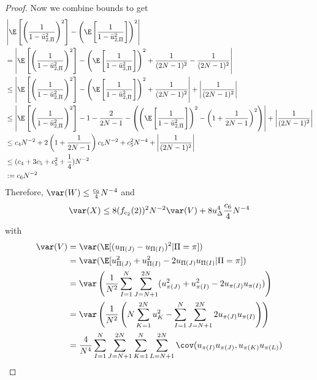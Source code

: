 \begin{proof}
  Now we combine bounds to get
  \begin{align*}
    &\left | \E \left [ \left (\frac{1}{1-\bar{u}_{2,\Pi}^2} \right )^2 \right ] -
      \left ( \E \left [ \frac{1}{1-\bar{u}_{2,\Pi}^2} \right ] \right )^2 \right | \\
    &= \left | \E \left [ \left (\frac{1}{1-\bar{u}_{2,\Pi}^2} \right )^2 \right ] -
      \left ( \E \left [ \frac{1}{1-\bar{u}_{2,\Pi}^2} \right ] \right )^2
    + \frac{1}{(2N-1)^2} - \frac{1}{(2N-1)^2} \right | \\
  &\leq \left | \E \left [ \left (\frac{1}{1-\bar{u}_{2,\Pi}^2} \right )^2 \right ] -
      \left ( \E \left [ \frac{1}{1-\bar{u}_{2,\Pi}^2} \right ] \right )^2
      + \frac{1}{(2N-1)^2} \right | + \left | \frac{1}{(2N-1)^2} \right |\\
    &\leq \left |
      \E \left [ \left (\frac{1}{1-\bar{u}_{2,\Pi}^2} \right )^2 \right ]
      - 1 - \frac{2}{2N-1} -
      \left (
        \left ( \E \left [ \frac{1}{1-\bar{u}_{2,\Pi}^2} \right ] \right )^2
        - \left ( 1 + \frac{1}{2N-1} \right )^2
      \right ) \right | + \left | \frac{1}{(2N-1)^2} \right | \\
    &\leq c_4 N^{-2}
    + 2 \left ( 1 + \frac{1}{2N-1} \right ) c_5 N^{-2} + c_5^2 N^{-4}
    + \left | \frac{1}{(2N-1)^2} \right | \\
    &\leq (c_4 + 3c_5 + c_5^2 + \frac{1}{4}) N^{-2} \\
    &:= c_6 N^{-2}
  \end{align*}
  Therefore, $\var(W) \leq \frac{c_6}{4}N^{-4}$ and
  \begin{equation*}
    \var(X) \leq 8(f_{c_2}(2))^2 N^{-2} \var(V) + 8u_{\Delta}^4 \frac{c_6}{4} N^{-4}
  \end{equation*}
  with
  \begin{align*}
    \var(V) &= \var (\E[(u_{\Pi(J)}-u_{\Pi(I)})^2 | \Pi = \pi]) \\
    &= \var(\E[u_{\Pi(J)}^2+u_{\Pi(I)}^2-2u_{\Pi(J)}u_{\Pi(I)}| \Pi = \pi]) \\
    &= \var \left ( \frac{1}{N^2} \sum_{I=1}^{N}\sum_{J=N+1}^{2N}
    (u_{\pi(J)}^2+u_{\pi(I)}^2-2u_{\pi(J)}u_{\pi(I)}) \right ) \\
    &= \var \left ( \frac{1}{N^2} \left ( N \sum_{K=1}^{2N}u_K^2 -
      \sum_{I=1}^{N}\sum_{J=N+1}^{2N}2u_{\pi(J)}u_{\pi(I)} \right ) \right ) \\
    &= \frac{4}{N^4}
    \sum_{I=1}^{N}\sum_{J=N+1}^{2N}\sum_{K=1}^{N}\sum_{L=N+1}^{2N}
    \cov(u_{\pi(I)}u_{\pi(J)},u_{\pi(K)}u_{\pi(L)})
  \end{align*}

\end{proof}
